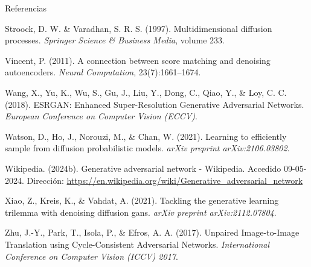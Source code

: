 \documentclass[aspectratio=169,xcolor=dvipsnames, t, spanish]{beamer}
\begin{document}
\begin{frame}{Referencias}
{\begin{thebibliography}{99}
             Stroock, D. W. \& Varadhan, S. R. S. (1997).
            \newblock Multidimensional diffusion processes.
            \newblock \emph{Springer Science \& Business Media}, volume 233.

             Vincent, P. (2011).
            \newblock A connection between score matching and denoising autoencoders.
            \newblock \emph{Neural Computation}, 23(7):1661–1674.

             Wang, X., Yu, K., Wu, S., Gu, J., Liu, Y., Dong, C., Qiao, Y., \& Loy, C. C. (2018).
            \newblock ESRGAN: Enhanced Super-Resolution Generative Adversarial Networks.
            \newblock \emph{European Conference on Computer Vision (ECCV)}.

             Watson, D., Ho, J., Norouzi, M., \& Chan, W. (2021).
            \newblock Learning to efficiently sample from diffusion probabilistic models.
            \newblock \emph{arXiv preprint arXiv:2106.03802}.

             Wikipedia. (2024b).
            \newblock Generative adversarial network - Wikipedia.
            \newblock Accedido 09-05-2024. Dirección: \url{https://en.wikipedia.org/wiki/Generative_adversarial_network}

             Xiao, Z., Kreis, K., \& Vahdat, A. (2021).
            \newblock Tackling the generative learning trilemma with denoising diffusion gans.
            \newblock \emph{arXiv preprint arXiv:2112.07804}.
            
             Zhu, J.-Y., Park, T., Isola, P., \& Efros, A. A. (2017).
            \newblock Unpaired Image-to-Image Translation using Cycle-Consistent Adversarial Networks.
            \newblock \emph{International Conference on Computer Vision (ICCV) 2017}.

        \end{thebibliography}
    }
\end{frame}

\end{document}
